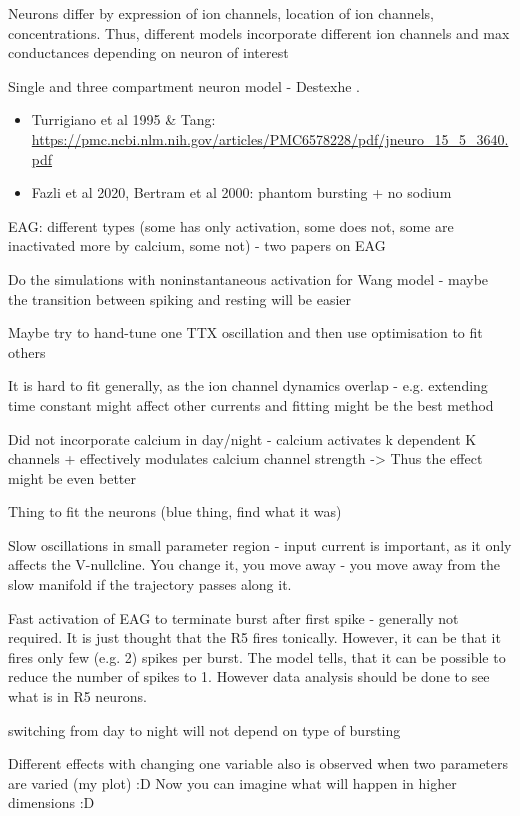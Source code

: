 \documentclass[../main.tex]{subfiles}
\begin{document}
Neurons differ by expression of ion channels, location of ion channels, concentrations. Thus,
different models incorporate different ion channels and max conductances depending on neuron of interest

Single and three compartment neuron model - Destexhe \parencite{destexheDendriticLowthresholdCalcium1998}.

\begin{itemize}
    \item Turrigiano et al 1995 \& Tang: \url{https://pmc.ncbi.nlm.nih.gov/articles/PMC6578228/pdf/jneuro_15_5_3640.pdf}
    \item Fazli et al 2020, Bertram et al 2000: phantom bursting + no sodium
\end{itemize}

EAG: different types (some has only activation, some does not, some are inactivated more by calcium, some not) - two papers on EAG

Do the simulations with noninstantaneous activation for Wang model - maybe the transition between
spiking and resting will be easier

Maybe try to hand-tune one TTX oscillation and then use optimisation to fit others

It is hard to fit generally, as the ion channel dynamics overlap - e.g. extending time constant
might affect other currents and fitting might be the best method

Did not incorporate calcium in day/night - calcium activates k dependent K channels + effectively modulates calcium channel strength -> Thus the effect might be even better

Thing to fit the neurons (blue thing, find what it was)

Slow oscillations in small parameter region - input current is important, as it only affects the V-nullcline. You change it, you move away - you move away from the slow manifold if the trajectory passes along it.

Fast activation of EAG to terminate burst after first spike - generally not required. It is just thought that the R5 fires tonically. However, it can be that it fires only few (e.g. 2) spikes per burst. The model tells, that it can be possible to reduce the number of spikes to 1. However data analysis should be done to see what is in R5 neurons.

switching from day to night will not depend on type of bursting

Different effects with changing one variable also is observed when two parameters are varied (my plot) :D Now you can imagine what will happen in higher dimensions :D
\end{document}
